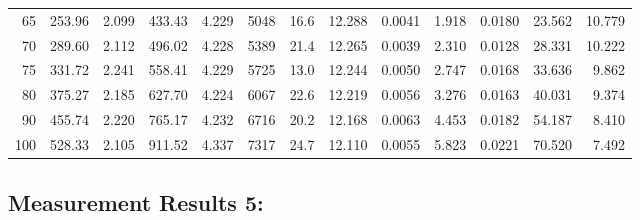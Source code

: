 \documentclass[10pt]{article}
\begin{document}
{\begin{tabular}{|r|rr|rr|rr|rr|rr|r|r|}
       65 &       253.96 &        2.099 &       433.43 &        4.229 &         5048 &         16.6 &       12.288 &       0.0041 &        1.918 &       0.0180 &       23.562 &       10.779 \\
       70 &       289.60 &        2.112 &       496.02 &        4.228 &         5389 &         21.4 &       12.265 &       0.0039 &        2.310 &       0.0128 &       28.331 &       10.222 \\
       75 &       331.72 &        2.241 &       558.41 &        4.229 &         5725 &         13.0 &       12.244 &       0.0050 &        2.747 &       0.0168 &       33.636 &        9.862 \\
       80 &       375.27 &        2.185 &       627.70 &        4.224 &         6067 &         22.6 &       12.219 &       0.0056 &        3.276 &       0.0163 &       40.031 &        9.374 \\
       90 &       455.74 &        2.220 &       765.17 &        4.232 &         6716 &         20.2 &       12.168 &       0.0063 &        4.453 &       0.0182 &       54.187 &        8.410 \\
      100 &       528.33 &        2.105 &       911.52 &        4.337 &         7317 &         24.7 &       12.110 &       0.0055 &        5.823 &       0.0221 &       70.520 &        7.492 \\
\hline
\end{tabular}
}



\subsection*{\large \bf Measurement Results 5:}
\end{document}
